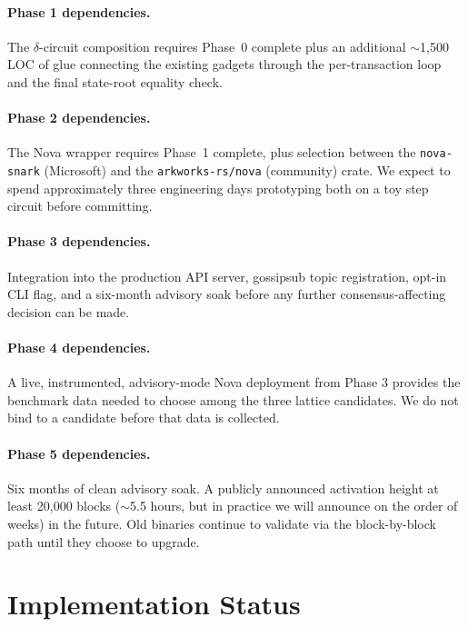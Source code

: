 \documentclass[11pt,a4paper]{article}
\begin{document}
\paragraph{Phase 1 dependencies.} The $\delta$-circuit composition
requires Phase~0 complete plus an additional $\sim$1{,}500 LOC of
glue connecting the existing gadgets through the per-transaction loop
and the final state-root equality check.

\paragraph{Phase 2 dependencies.} The Nova wrapper requires Phase~1
complete, plus selection between the \texttt{nova-snark} (Microsoft)
and the \texttt{arkworks-rs/nova} (community) crate. We expect to
spend approximately three engineering days prototyping both on a toy
step circuit before committing.

\paragraph{Phase 3 dependencies.} Integration into the production API
server, gossipsub topic registration, opt-in CLI flag, and a six-month
advisory soak before any further consensus-affecting decision can be
made.

\paragraph{Phase 4 dependencies.} A live, instrumented, advisory-mode
Nova deployment from Phase 3 provides the benchmark data needed to
choose among the three lattice candidates. We do not bind to a
candidate before that data is collected.

\paragraph{Phase 5 dependencies.} Six months of clean advisory
soak. A publicly announced activation height at least 20{,}000 blocks
($\sim$5.5 hours, but in practice we will announce on the order of
weeks) in the future. Old binaries continue to validate via the
block-by-block path until they choose to upgrade.

\section{Implementation Status}
\label{sec:status}
\end{document}

